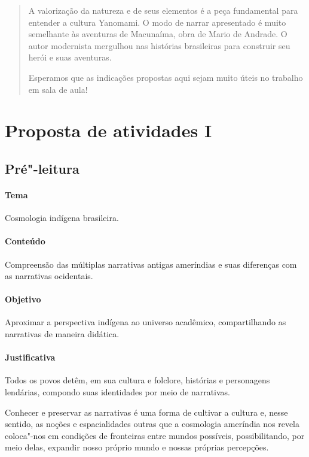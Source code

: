 \documentclass[12pt]{extarticle}
\begin{document}
{\begin{abstract}
A valorização da natureza e de seus elementos é a peça fundamental para entender 
a cultura Yanomami. O modo de narrar apresentado é muito semelhante às aventuras 
de Macunaíma, obra de Mario de Andrade. O autor modernista mergulhou nas histórias 
brasileiras para construir seu herói e suas aventuras.

Esperamos que as indicações propostas aqui sejam muito úteis no trabalho em
sala de aula! 


\end{abstract}


\tableofcontents
\section{Proposta de atividades I}

\subsection{Pré"-leitura}

\paragraph{Tema} Cosmologia indígena brasileira.

\paragraph{Conteúdo} Compreensão das múltiplas narrativas antigas ameríndias
e suas diferenças com as narrativas ocidentais. 

\paragraph{Objetivo} Aproximar a perspectiva indígena ao universo acadêmico, 
compartilhando as narrativas de maneira didática.

\paragraph{Justificativa} Todos os povos detêm, em sua cultura e folclore,
histórias e personagens lendárias, compondo suas identidades por meio de
narrativas. 

Conhecer e preservar as narrativas é uma forma de
cultivar a cultura e, nesse sentido, as noções e espacialidades outras 
que a cosmologia ameríndia nos revela coloca"-nos em condições de fronteiras 
entre mundos possíveis, possibilitando, por meio delas, expandir nosso 
próprio mundo e nossas próprias percepções.

}
\end{document}

